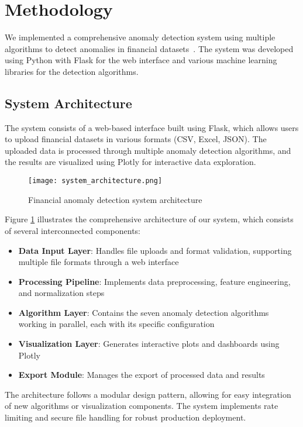 \documentclass[conference]{IEEEtran}
\begin{document}
\section{Methodology}
We implemented a comprehensive anomaly detection system using multiple algorithms to detect anomalies in financial datasets~\cite{li2024, parimi2024}. The system was developed using Python with Flask for the web interface and various machine learning libraries for the detection algorithms.

\subsection{System Architecture}
The system consists of a web-based interface built using Flask, which allows users to upload financial datasets in various formats (CSV, Excel, JSON). The uploaded data is processed through multiple anomaly detection algorithms, and the results are visualized using Plotly for interactive data exploration.

\begin{figure}[!ht]
\centering
\texttt{[image: system\_architecture.png]}
\caption{Financial anomaly detection system architecture}
\label{fig:architecture}
\end{figure}

Figure \ref{fig:architecture} illustrates the comprehensive architecture of our system, which consists of several interconnected components:

\begin{itemize}
    \item \textbf{Data Input Layer}: Handles file uploads and format validation, supporting multiple file formats through a web interface
    \item \textbf{Processing Pipeline}: Implements data preprocessing, feature engineering, and normalization steps
    \item \textbf{Algorithm Layer}: Contains the seven anomaly detection algorithms working in parallel, each with its specific configuration
    \item \textbf{Visualization Layer}: Generates interactive plots and dashboards using Plotly
    \item \textbf{Export Module}: Manages the export of processed data and results
\end{itemize}

The architecture follows a modular design pattern, allowing for easy integration of new algorithms or visualization components. The system implements rate limiting and secure file handling for robust production deployment.
\end{document}
